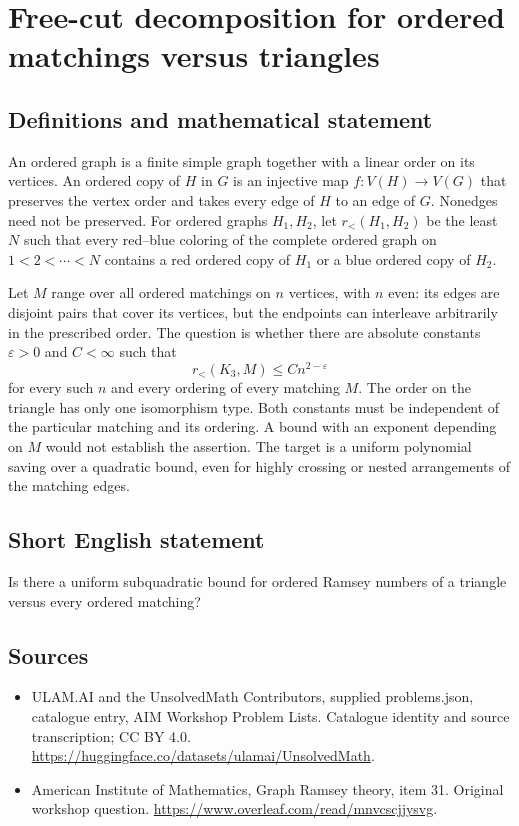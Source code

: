 \documentclass[11pt,a4paper]{article}
\begin{document}
\section*{Free-cut decomposition for ordered matchings versus triangles}\label{statement}

\subsection{Definitions and mathematical statement}
An ordered graph is a finite simple graph together with a linear order
on its vertices. An ordered copy of $H$ in $G$ is an injective map
$f:V(H)\to V(G)$ that preserves the vertex order and takes every edge
of $H$ to an edge of $G$. Nonedges need not be preserved.
For ordered graphs $H_1,H_2$, let $r_<(H_1,H_2)$ be the least $N$
such that every red--blue coloring of the complete ordered graph on
$1<2<\cdots<N$ contains a red ordered copy of $H_1$ or a blue ordered
copy of $H_2$.

Let $M$ range over all ordered matchings on $n$ vertices, with $n$
even: its edges are disjoint pairs that cover its vertices, but the
endpoints can interleave arbitrarily in the prescribed order.
The question is whether there are absolute constants $\varepsilon>0$
and $C<\infty$ such that
\[
                       r_<(K_3,M)\le Cn^{2-\varepsilon}
\]
for every such $n$ and every ordering of every matching $M$.
The order on the triangle has only one isomorphism type.
Both constants must be independent of the particular matching and its
ordering. A bound with an exponent depending on $M$ would not establish
the assertion. The target is a uniform polynomial saving over a
quadratic bound, even for highly crossing or nested arrangements of
the matching edges.
\subsection{Short English statement}
Is there a uniform subquadratic bound for ordered Ramsey numbers of a triangle versus every ordered matching?
\subsection{Sources}
\begin{itemize}
\item[S1] ULAM.AI and the UnsolvedMath Contributors, supplied problems.json, catalogue entry, AIM Workshop Problem Lists. Catalogue identity and source transcription; CC BY 4.0.
\url{https://huggingface.co/datasets/ulamai/UnsolvedMath}.
\item[S2] American Institute of Mathematics, Graph Ramsey theory, item 31. Original workshop question.
\url{https://www.overleaf.com/read/mnvcscjjysvg}.
\end{itemize}
\end{document}
